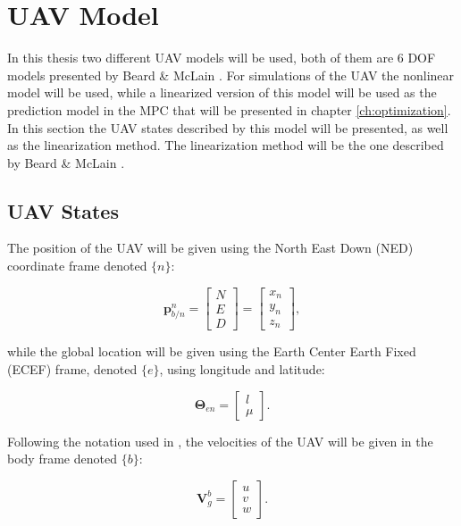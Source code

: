 \section{UAV Model}
\label{sec:model}

In this thesis two different UAV models will be used, both of them are 6 DOF models presented by Beard \& McLain \cite{uavBEARD}. For simulations of the UAV the nonlinear model will be used, while a linearized version of this model will be used as the prediction model in the MPC that will be presented in chapter \ref{ch:optimization}. In this section the UAV states described by this model will be presented, as well as the linearization method. The linearization method will be the one described by Beard \& McLain \cite{uavBEARD}.

\subsection{UAV States}
The position of the UAV will be given using the North East Down (NED) coordinate frame denoted $\{n\}$:

\begin{equation}
	\mathbf{p}_{b/n}^n =
	\begin{bmatrix}
		N \\ E \\ D
	\end{bmatrix}
	=
	\begin{bmatrix}
		x_n \\ y_n \\ z_n
	\end{bmatrix},
\end{equation}

while the global location will be given using the Earth Center Earth Fixed (ECEF) frame, denoted $\{e\}$, using longitude and latitude:

\begin{equation}
	\bm{\Theta}_{en} =
	\begin{bmatrix}
		l \\ \mu
	\end{bmatrix}.
\end{equation} 

Following the notation used in \cite{uavBEARD}, the velocities of the UAV will be given in the body frame denoted $\{b\}$:

\begin{equation}
	\mathbf{V}^b_g =
	\begin{bmatrix}
		u \\ v \\ w
	\end{bmatrix}.
\end{equation}

